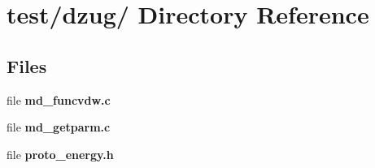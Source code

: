 \section{test/dzug/ Directory Reference}
\label{dir_f6b7de35adb7cf57fda34b7a7436b699}
\subsection*{Files}
\begin{CompactItemize}
\item 
file {\bf md\_\-funcvdw.c}
\item 
file {\bf md\_\-getparm.c}
\item 
file {\bf proto\_\-energy.h}
\end{CompactItemize}
